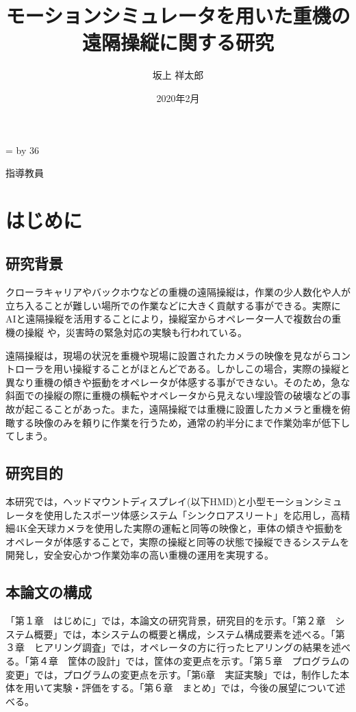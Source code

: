 \documentclass[a4paper,12pt]{jsarticle}
\title{モーションシミュレータを用いた重機の遠隔操縦に関する研究} %
\date{2020年2月} %
\author{坂上 祥太郎} %
\makeatletter
\renewcommand{\maketitle}{
  \begin{titlepage}
    \centering
    {\fontsize{18pt}{36pt}\selectfont \@yearnendo{卒業研究}\par}
    \vspace{42pt}
    \vspace{42pt}
    \vspace{42pt}
    {\huge\textsf{\@title}\par}
    \vspace{42pt}
    \vspace{42pt}
    \vspace{42pt}
    {\fontsize{14pt}{42pt}\selectfont {東京工業高等専門学校　情報工学科}\par}
    {\fontsize{14pt}{42pt}\selectfont \@lab\par}
    {\fontsize{14pt}{42pt}\selectfont {学籍番号:\@studentschoolid}\par}
    {\fontsize{14pt}{42pt}\selectfont {\@studentclassid　\@author}\par}
    \vspace{28pt}
    {\fontsize{14pt}{28pt}\selectfont 指導教員　\@professor\par}
  
    \vfill
  
  \end{titlepage}
}
\def\linesparpage#1{
    \baselineskip=\textheight
    \divide\baselineskip by #1
}
\makeatother
\begin{document}
\linesparpage{36} %

\maketitle

\tableofcontents
\thispagestyle{empty}
\clearpage

\setcounter{page}{1}
\pagestyle{plain}

\section{はじめに}

\subsection{研究背景}
クローラキャリアやバックホウなどの重機の遠隔操縦は，作業の少人数化や人が立ち入ることが難しい場所での作業などに大きく貢献する事ができる。実際にAIと遠隔操縦を活用することにより，操縦室からオペレータ一人で複数台の重機の操縦 \cite{kumagai_AI}や，災害時の緊急対応の実験\cite{kumagai_mujin}も行われている。

遠隔操縦は，現場の状況を重機や現場に設置されたカメラの映像を見ながらコントローラを用い操縦することがほとんどである。しかしこの場合，実際の操縦と異なり重機の傾きや振動をオペレータが体感する事ができない。そのため，急な斜面での操縦の際に重機の横転やオペレータから見えない埋設管の破壊などの事故が起こることがあった。また，遠隔操縦では重機に設置したカメラと重機を俯瞰する映像のみを頼りに作業を行うため，通常の約半分にまで作業効率が低下してしまう\cite{nec}。

\subsection{研究目的}
本研究では，ヘッドマウントディスプレイ(以下HMD)と小型モーションシミュレータを使用したスポーツ体感システム「シンクロアスリート」を応用し，高精細4K全天球カメラを使用した実際の運転と同等の映像と，車体の傾きや振動をオペレータが体感することで，実際の操縦と同等の状態で操縦できるシステムを開発し，安全安心かつ作業効率の高い重機の運用を実現する。

\subsection{本論文の構成}
「第１章　はじめに」では，本論文の研究背景，研究目的を示す。「第２章　システム概要」では，本システムの概要と構成，システム構成要素を述べる。「第３章　ヒアリング調査」では，オペレータの方に行ったヒアリングの結果を述べる。「第４章　筐体の設計」では，筐体の変更点を示す。「第５章　プログラムの変更」では，プログラムの変更点を示す。「第6章　実証実験」では，制作した本体を用いて実験・評価をする。「第６章　まとめ」では，今後の展望について述べる。
\end{document}
